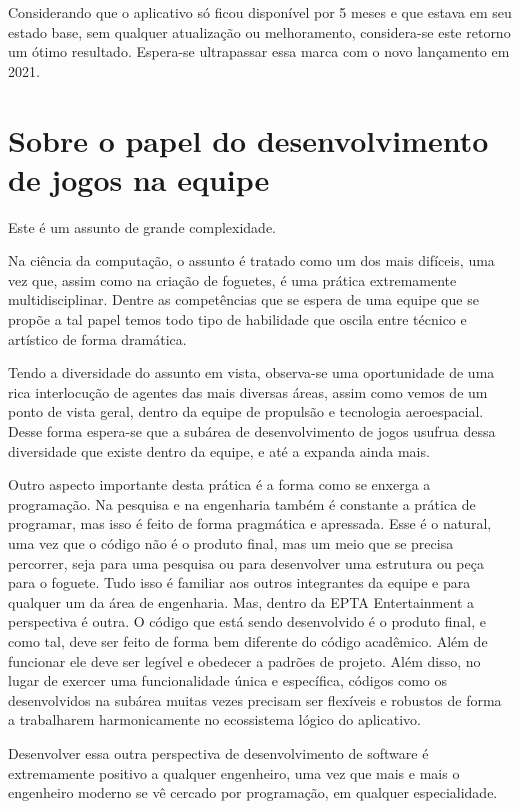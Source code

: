     Considerando que o aplicativo só ficou disponível por 5 meses e que estava em seu estado base, sem qualquer atualização ou melhoramento, considera-se este retorno um ótimo resultado. Espera-se ultrapassar essa marca com o novo lançamento em 2021.

    \section{Sobre o papel do desenvolvimento de jogos na equipe}

        Este é um assunto de grande complexidade. 
        
        Na ciência da computação, o assunto é tratado como um dos mais difíceis, uma vez que, assim como na criação de foguetes, é uma prática extremamente multidisciplinar. 
        Dentre as competências que se espera de uma equipe que se propõe a tal papel temos todo tipo de habilidade que oscila entre técnico e artístico de forma dramática. 

        Tendo a diversidade do assunto em vista, observa-se uma oportunidade de uma rica interlocução de agentes das mais diversas áreas, assim como vemos de um ponto de vista geral, dentro da equipe de propulsão e tecnologia aeroespacial. 
        Desse forma espera-se que a subárea de desenvolvimento de jogos usufrua dessa diversidade que existe dentro da equipe, e até a expanda ainda mais.

        Outro aspecto importante desta prática é a forma como se enxerga a programação. 
        Na pesquisa e na engenharia também é constante a prática de programar, mas isso é feito de forma pragmática e apressada.
        Esse é o natural, uma vez que o código não é o produto final, mas um meio que se precisa percorrer, seja para uma pesquisa ou para desenvolver uma estrutura ou peça para o foguete.
        Tudo isso é familiar aos outros integrantes da equipe e para qualquer um da área de engenharia.
        Mas, dentro da EPTA Entertainment a perspectiva é outra.
        O código que está sendo desenvolvido é o produto final, e como tal, deve ser feito de forma bem diferente do código acadêmico. 
        Além de funcionar ele deve ser legível e obedecer a padrões de projeto. 
        Além disso, no lugar de exercer uma funcionalidade única e específica, códigos como os desenvolvidos na subárea muitas vezes precisam ser flexíveis e robustos de forma a trabalharem harmonicamente no ecossistema lógico do aplicativo.
        
        Desenvolver essa outra perspectiva de desenvolvimento de software é extremamente positivo a qualquer engenheiro, uma vez que mais e mais o engenheiro moderno se vê cercado por programação, em qualquer especialidade.

